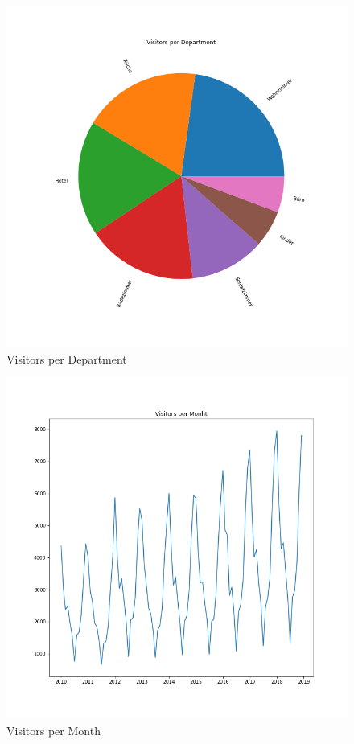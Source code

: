 \documentclass[letterpaper,12pt]{article}
\begin{document}
\begin{figure}[H] 
        \centering
        \includegraphics[width=\columnwidth]{../images/department.png}
        \caption{
                \label{fig:department}  
                Visitors per Department
        }
\end{figure}


\begin{figure}[H] 
        \centering
        \includegraphics[width=\columnwidth]{../images/month.png}
        \caption{
                \label{fig:month}  
                Visitors per Month
        }
\end{figure}
\end{document}
